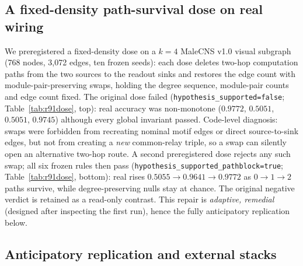 \documentclass[10pt,twocolumn,letterpaper]{article}
\begin{document}
\subsection{A fixed-density path-survival dose on real wiring}
\label{sec:realwiringdose}

We preregistered a fixed-density dose on a $k{=}4$ MaleCNS v1.0 visual
subgraph (768 nodes, 3{,}072 edges, ten frozen seeds): each dose deletes
two-hop computation paths from the two sources to the readout sinks and
restores the edge count with module-pair-preserving swaps, holding the degree
sequence, module-pair counts and edge count fixed. The original dose failed
(\texttt{hypothesis\_supported=false}; Table~\ref{tab:r91dose}, top): real
accuracy was non-monotone ($0.9772$, $0.5051$, $0.5051$, $0.9745$) although
every global invariant passed. Code-level diagnosis: swaps were forbidden from
recreating nominal motif edges or direct source-to-sink edges, but not from
creating a \emph{new} common-relay triple, so a swap can silently open an
alternative two-hop route. A second preregistered dose rejects any such swap;
all six frozen rules then pass
(\texttt{hypothesis\_supported\_pathblock=true};
Table~\ref{tab:r91dose}, bottom): real rises $0.5055\!\to\!0.9641\!\to\!0.9772$
as $0\!\to\!1\!\to\!2$ paths survive, while degree-preserving nulls stay at
chance. The original negative verdict is retained as a read-only contrast.
This repair is \emph{adaptive, remedial} (designed after inspecting the first
run), hence the fully anticipatory replication below.

\subsection{Anticipatory replication and external stacks}
\label{sec:realwiringrepl}
\end{document}
